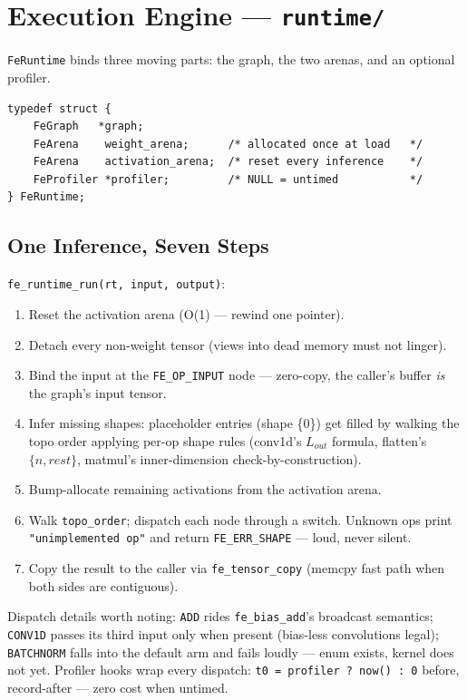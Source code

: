 \documentclass[11pt,a4paper]{article}
\begin{document}
\section{Execution Engine --- \texttt{runtime/}}

\texttt{FeRuntime} binds three moving parts: the graph, the two arenas, and an
optional profiler.

\begin{lstlisting}[style=cstyle]
typedef struct {
    FeGraph   *graph;
    FeArena    weight_arena;      /* allocated once at load   */
    FeArena    activation_arena;  /* reset every inference    */
    FeProfiler *profiler;         /* NULL = untimed           */
} FeRuntime;
\end{lstlisting}

\subsection{One Inference, Seven Steps}

\texttt{fe\_runtime\_run(rt, input, output)}:

\begin{enumerate}[itemsep=1pt]
\item Reset the activation arena (O(1) --- rewind one pointer).
\item Detach every non-weight tensor (views into dead memory must not linger).
\item Bind the input at the \texttt{FE\_OP\_INPUT} node --- zero-copy, the
      caller's buffer \emph{is} the graph's input tensor.
\item Infer missing shapes: placeholder entries (shape \{0\}) get filled by
      walking the topo order applying per-op shape rules (conv1d's
      $L_{out}$ formula, flatten's $\{n, rest\}$, matmul's inner-dimension
      check-by-construction).
\item Bump-allocate remaining activations from the activation arena.
\item Walk \texttt{topo\_order}; dispatch each node through a switch. Unknown ops
      print \texttt{"unimplemented op"} and return \texttt{FE\_ERR\_SHAPE} ---
      loud, never silent.
\item Copy the result to the caller via \texttt{fe\_tensor\_copy} (memcpy fast
      path when both sides are contiguous).
\end{enumerate}

Dispatch details worth noting: \texttt{ADD} rides \texttt{fe\_bias\_add}'s
broadcast semantics; \texttt{CONV1D} passes its third input only when present
(bias-less convolutions legal); \texttt{BATCHNORM} falls into the default arm
and fails loudly --- enum exists, kernel does not yet. Profiler hooks wrap every
dispatch: \texttt{t0 = profiler ? now() : 0} before, record-after --- zero cost
when untimed.
\end{document}
